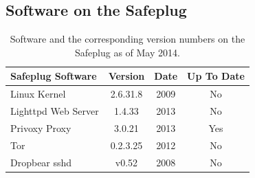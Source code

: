 \documentclass[letterpaper,twocolumn,10pt]{article}
\begin{document}


\subsection{Software on the Safeplug}
\begin{table}[!t]
\renewcommand{\arraystretch}{1.3}
\caption{Software and the corresponding version numbers on the Safeplug as of May 2014.}
\label{versions}
\begin{center}
\small
  \begin{tabular}{|l|c|c|c|}
    \hline
    Safeplug Software & Version & Date & Up To Date\\ \hline
    Linux Kernel & 2.6.31.8 & 2009 & No\\ \hline
    Lighttpd Web Server & 1.4.33 & 2013 & No\\ \hline
    Privoxy Proxy & 3.0.21 & 2013 & Yes\\ \hline
    Tor & 0.2.3.25 & 2012 & No\\ \hline
    Dropbear sshd & v0.52 & 2008 & No\\ \hline
  \end{tabular}
\end{center}
\end{table}
\end{document}
